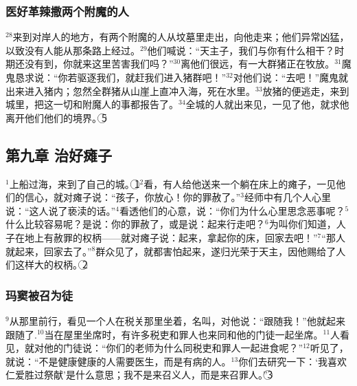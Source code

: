 \subsubsection{医好革辣撒两个附魔的人}
$^{28}$\UL[耶稣]来到对岸\UL[加达辣]人的地方，有两个附魔的人从坟墓里走出，向他走来；他们异常凶猛，以致没有人能从那条路上经过。$^{29}$他们喊说：“天主子，我们与你有什么相干？时期还没有到，你就来这里苦害我们吗？”$^{30}$离他们很远，有一大群猪正在牧放。$^{31}$魔鬼恳求\UL[耶稣]说：“你若驱逐我们，就赶我们进入猪群吧！”$^{32}$\UL[耶稣]对他们说：“去吧！”魔鬼就出来进入猪内；忽然全群猪从山崖上直冲入海，死在水里。$^{33}$放猪的便逃走，来到城里，把这一切和附魔人的事都报告了。$^{34}$全城的人就出来见\UL[耶稣]，一见了他，就求他离开他们他们的境界。\textcircled{5}


\subsection{第九章 治好瘫子}
$^{1}$\UL[耶稣]上船过海，来到了自己的城。\textcircled{1}$^{2}$看，有人给他送来一个躺在床上的瘫子，\UL[耶稣]一见他们的信心，就对瘫子说：“孩子，你放心！你的罪赦了。”$^{3}$经师中有几个人心里说：“这人说了亵渎的话。”$^{4}$\UL[耶稣]看透他们的心意，说：“你们为什么心里思念恶事呢？$^{5}$什么比较容易呢？是说：你的罪赦了，或是说：起来行走吧？$^{6}$为叫你们知道，人子在地上有赦罪的权柄——就对瘫子说：起来，拿起你的床，回家去吧！”$^{7}$“那人就起来，回家去了。”$^{8}$群众见了，就都害怕起来，遂归光荣于天主，因他赐给了人们这样大的权柄。\textcircled{2}


\subsubsection{玛窦被召为徒}
$^{9}$\UL[耶稣]从那里前行，看见一个人在税关那里坐着，名叫\UL[玛窦]，对他说：“跟随我！”他就起来跟随了\UL[耶稣].$^{10}$当\UL[耶稣]在屋里坐席时，有许多税吏和罪人也来同\UL[耶稣]和他的门徒一起坐席。$^{11}$\UL[法利塞]人看见，就对他的门徒说：“你们的老师为什么同税吏和罪人一起进食呢？”$^{12}$\UL[耶稣]听见了，就说：“不是健康健康的人需要医生，而是有病的人。$^{13}$你们去研究一下：‘我喜欢仁爱胜过祭献’是什么意思；我不是来召义人，而是来召罪人。”\textcircled{3}


